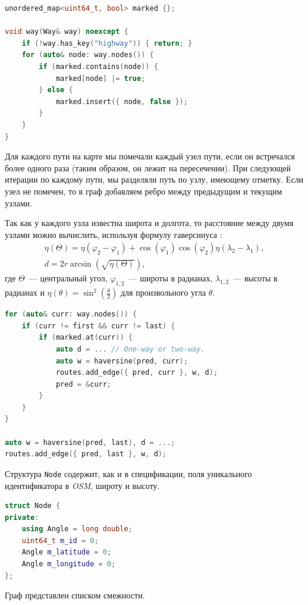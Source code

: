 \documentclass[11pt]{article}
\begin{document}
	\begin{lstlisting}[language=C++]
unordered_map<uint64_t, bool> marked {};
 
void way(Way& way) noexcept {
	if (!way.has_key("highway")) { return; }
	for (auto& node: way.nodes()) {
		if (marked.contains(node)) {
			marked[node] |= true;
		} else {
			marked.insert({ node, false });
		}
	}
}
	\end{lstlisting}
	
	Для каждого пути на карте мы помечали каждый узел пути, если он встречался более одного раза (таким образом, он лежит на пересечении).
	При следующей итерации по каждому пути, мы разделяли путь по узлу, имеющему отметку.
	Если узел не помечен, то в граф добавляем ребро между предыдущим и текущим узлами.
	
	Так как у каждого узла известна широта и долгота, то расстояние между двумя узлами можно вычислить, используя формулу гаверсинуса \cite{haversine}:
\begin{gather*}
	\eta(\Theta) = \eta(\varphi_2 - \varphi_1) + \cos(\varphi_1) \cos(\varphi_2) \eta(\lambda_2 - \lambda_1), \\
	d = 2r \arcsin(\sqrt{\eta(\Theta)}),
\end{gather*}
	где $ \Theta $~--- центральный угол, $ \varphi_{1,2} $~--- широты в радианах, $ \lambda_{1,2} $~--- высоты в радианах и $ \eta(\theta) = \sin^2 \left(\frac{\theta}{2}\right) $ для произвольного угла $ \theta $.
	
	\begin{lstlisting}[language=C++]
for (auto& curr: way.nodes()) {
	if (curr != first && curr != last) {
     	if (marked.at(curr)) {
     		auto d = ... // One-way or two-way.
			auto w = haversine(pred, curr);
			routes.add_edge({ pred, curr }, w, d);
			pred = &curr;
		}
	}
}

auto w = haversine(pred, last), d = ...;
routes.add_edge({ pred, last }, w, d);
 	\end{lstlisting}
 	
	Структура \texttt{Node} содержит, как и в спецификации, поля уникального идентификатора в \textit{OSM}, широту и высоту.
 	
	\begin{lstlisting}[language=C++]
struct Node {
private:
	using Angle = long double; 
	uint64_t m_id = 0;
	Angle m_latitude = 0;
	Angle m_longitude = 0;
};
	\end{lstlisting} 	
 	
 	Граф представлен списком смежности.
 	
\end{document}

